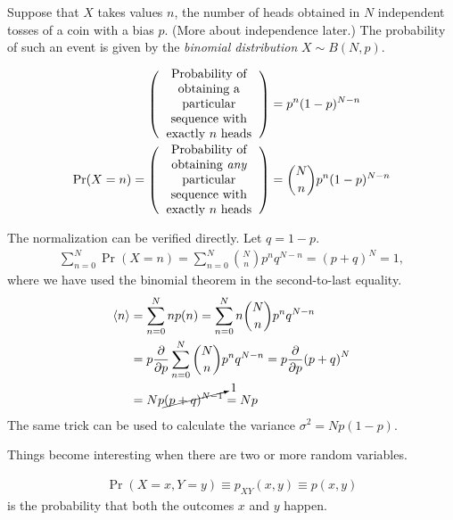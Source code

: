 \begin{example}\leavevmode
	
	Suppose that $X$ takes values $n$, the number of heads obtained in $N$ independent tosses of a coin with a bias $p$. (More about independence later.) The probability of such an event is given by the \emph{binomial distribution} $X\sim B(N,p)$. 
	
	\begin{align}
	\left(\parbox{8em}{\centering Probability of obtaining a particular sequence with exactly $n$ heads}\right) &= p^n(1-p)^{N-n} \\
	\Pr(X=n)  = \left(\parbox{8em}{\centering Probability of obtaining \emph{any} particular sequence with exactly $n$ heads}\right) &= {N \choose n}p^n(1-p)^{N-n}
	\end{align}

	The normalization can be verified directly. Let $q=1-p$.
	\begin{align}
		\sum_{n=0}^N \Pr(X=n) = \sum_{n=0}^N{N \choose n}p^n q^{N-n} 
		= (p+q)^N = 1,
	\end{align}
	where we have used the binomial theorem in the second-to-last equality.
	\begin{align}
		\left\langle n \right\rangle &= \sum_{n=0}^N np(n) = \sum_{n=0}^N n{N \choose n}p^n q^{N-n} \\
		&= p \pdv{p}\sum_{n=0}^N {N \choose n}p^n q^{N-n}
		= p \pdv{p}(p+q)^N \\
		&= Np \cancelto{1}{(p+q)^{N-1}} = Np
	\end{align}
	The same trick can be used to calculate the variance  $\sigma^2 = Np(1-p)$.
\end{example}



Things become interesting when there are two or more random variables.
\begin{definition}\leavevmode
	\begin{align}
		\Pr(X=x,Y=y) \equiv p_{XY}(x,y) \equiv p(x,y)
	\end{align} 
	is the probability that both the outcomes $x$ and $y$ happen.
\end{definition}

